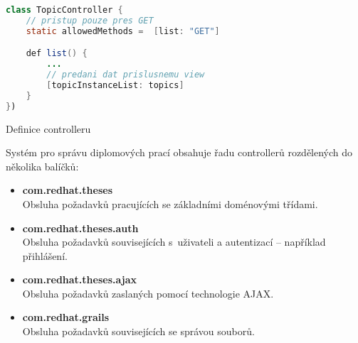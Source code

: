 \begin{example}
\centering
\begin{lstlisting}[language=Java]
class TopicController {
    // pristup pouze pres GET
    static allowedMethods =  [list: "GET"]

    def list() {
        ...
        // predani dat prislusnemu view
        [topicInstanceList: topics]
    }
})
\end{lstlisting}
\caption{Definice controlleru}
\end{example}


Systém pro správu diplomových prací obsahuje řadu controllerů rozdělených do několika balíčků:
\begin{itemize}
\item \textbf{com.redhat.theses} \\
Obsluha požadavků pracujících se základními doménovými třídami.
\item \textbf{com.redhat.theses.auth} \\
Obsluha požadavků souvisejících s~uživateli a autentizací -- například přihlášení.
\item \textbf{com.redhat.theses.ajax} \\
Obsluha požadavků zaslaných pomocí technologie AJAX.
\item \textbf{com.redhat.grails} \\
Obsluha požadavků souvisejících se správou souborů.
\end{itemize}


